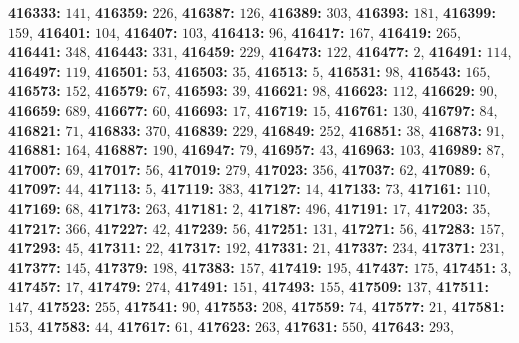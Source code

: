 \textsf{\bfseries 416333:} $141$, \textsf{\bfseries 416359:} $226$, \textsf{\bfseries 416387:} $126$, \textsf{\bfseries 416389:} $303$, \textsf{\bfseries 416393:} $181$, \textsf{\bfseries 416399:} $159$, \textsf{\bfseries 416401:} $104$, \textsf{\bfseries 416407:} $103$, \textsf{\bfseries 416413:} $96$, \textsf{\bfseries 416417:} $167$, \textsf{\bfseries 416419:} $265$, \textsf{\bfseries 416441:} $348$, \textsf{\bfseries 416443:} $331$, \textsf{\bfseries 416459:} $229$, \textsf{\bfseries 416473:} $122$, \textsf{\bfseries 416477:} $2$, \textsf{\bfseries 416491:} $114$, \textsf{\bfseries 416497:} $119$, \textsf{\bfseries 416501:} $53$, \textsf{\bfseries 416503:} $35$, \textsf{\bfseries 416513:} $5$, \textsf{\bfseries 416531:} $98$, \textsf{\bfseries 416543:} $165$, \textsf{\bfseries 416573:} $152$, \textsf{\bfseries 416579:} $67$, \textsf{\bfseries 416593:} $39$, \textsf{\bfseries 416621:} $98$, \textsf{\bfseries 416623:} $112$, \textsf{\bfseries 416629:} $90$, \textsf{\bfseries 416659:} $689$, \textsf{\bfseries 416677:} $60$, \textsf{\bfseries 416693:} $17$, \textsf{\bfseries 416719:} $15$, \textsf{\bfseries 416761:} $130$, \textsf{\bfseries 416797:} $84$, \textsf{\bfseries 416821:} $71$, \textsf{\bfseries 416833:} $370$, \textsf{\bfseries 416839:} $229$, \textsf{\bfseries 416849:} $252$, \textsf{\bfseries 416851:} $38$, \textsf{\bfseries 416873:} $91$, \textsf{\bfseries 416881:} $164$, \textsf{\bfseries 416887:} $190$, \textsf{\bfseries 416947:} $79$, \textsf{\bfseries 416957:} $43$, \textsf{\bfseries 416963:} $103$, \textsf{\bfseries 416989:} $87$, \textsf{\bfseries 417007:} $69$, \textsf{\bfseries 417017:} $56$, \textsf{\bfseries 417019:} $279$, \textsf{\bfseries 417023:} $356$, \textsf{\bfseries 417037:} $62$, \textsf{\bfseries 417089:} $6$, \textsf{\bfseries 417097:} $44$, \textsf{\bfseries 417113:} $5$, \textsf{\bfseries 417119:} $383$, \textsf{\bfseries 417127:} $14$, \textsf{\bfseries 417133:} $73$, \textsf{\bfseries 417161:} $110$, \textsf{\bfseries 417169:} $68$, \textsf{\bfseries 417173:} $263$, \textsf{\bfseries 417181:} $2$, \textsf{\bfseries 417187:} $496$, \textsf{\bfseries 417191:} $17$, \textsf{\bfseries 417203:} $35$, \textsf{\bfseries 417217:} $366$, \textsf{\bfseries 417227:} $42$, \textsf{\bfseries 417239:} $56$, \textsf{\bfseries 417251:} $131$, \textsf{\bfseries 417271:} $56$, \textsf{\bfseries 417283:} $157$, \textsf{\bfseries 417293:} $45$, \textsf{\bfseries 417311:} $22$, \textsf{\bfseries 417317:} $192$, \textsf{\bfseries 417331:} $21$, \textsf{\bfseries 417337:} $234$, \textsf{\bfseries 417371:} $231$, \textsf{\bfseries 417377:} $145$, \textsf{\bfseries 417379:} $198$, \textsf{\bfseries 417383:} $157$, \textsf{\bfseries 417419:} $195$, \textsf{\bfseries 417437:} $175$, \textsf{\bfseries 417451:} $3$, \textsf{\bfseries 417457:} $17$, \textsf{\bfseries 417479:} $274$, \textsf{\bfseries 417491:} $151$, \textsf{\bfseries 417493:} $155$, \textsf{\bfseries 417509:} $137$, \textsf{\bfseries 417511:} $147$, \textsf{\bfseries 417523:} $255$, \textsf{\bfseries 417541:} $90$, \textsf{\bfseries 417553:} $208$, \textsf{\bfseries 417559:} $74$, \textsf{\bfseries 417577:} $21$, \textsf{\bfseries 417581:} $153$, \textsf{\bfseries 417583:} $44$, \textsf{\bfseries 417617:} $61$, \textsf{\bfseries 417623:} $263$, \textsf{\bfseries 417631:} $550$, \textsf{\bfseries 417643:} $293$, 
